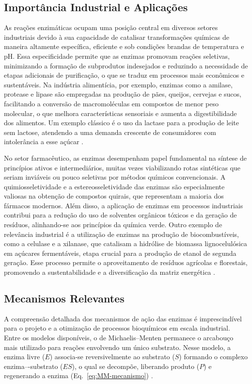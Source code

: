 \documentclass[12pt,oneside]{report}
\begin{document}
\subsection{Importância Industrial e Aplicações}

As reações enzimáticas ocupam uma posição central em diversos setores industriais devido à sua capacidade de catalisar transformações químicas de maneira altamente específica, eficiente e sob condições brandas de temperatura e pH. Essa especificidade permite que as enzimas promovam reações seletivas, minimizando a formação de subprodutos indesejados e reduzindo a necessidade de etapas adicionais de purificação, o que se traduz em processos mais econômicos e sustentáveis. Na indústria alimentícia, por exemplo, enzimas como a amilase, protease e lipase são empregadas na produção de pães, queijos, cervejas e sucos, facilitando a conversão de macromoléculas em compostos de menor peso molecular, o que melhora características sensoriais e aumenta a digestibilidade dos alimentos. Um exemplo clássico é o uso da lactase para a produção de leite sem lactose, atendendo a uma demanda crescente de consumidores com intolerância a esse açúcar \cite{buchholz2016enzymes}.

No setor farmacêutico, as enzimas desempenham papel fundamental na síntese de princípios ativos e intermediários, muitas vezes viabilizando rotas sintéticas que seriam inviáveis ou pouco seletivas por métodos químicos convencionais. A quimiosseletividade e a estereosseletividade das enzimas são especialmente valiosas na obtenção de compostos quirais, que representam a maioria dos fármacos modernos. Além disso, a aplicação de enzimas em processos industriais contribui para a redução do uso de solventes orgânicos tóxicos e da geração de resíduos, alinhando-se aos princípios da química verde. Outro exemplo de relevância industrial é a utilização de enzimas na produção de biocombustíveis, como a celulase e a xilanase, que catalisam a hidrólise de biomassa lignocelulósica em açúcares fermentáveis, etapa crucial para a produção de etanol de segunda geração. Esse processo permite o aproveitamento de resíduos agrícolas e florestais, promovendo a sustentabilidade e a diversificação da matriz energética \cite{patel2007biocatalysis}.

\subsection{Mecanismos Relevantes}

A compreensão detalhada dos mecanismos de ação das enzimas é imprescindível para o projeto e a otimização de processos bioquímicos em escala industrial. Entre os modelos disponíveis, o de Michaelis--Menten permanece o arcabouço mais utilizado para reações envolvendo um único substrato. Nesse modelo, a enzima livre ($E$) associa-se reversivelmente ao substrato ($S$) formando o complexo enzima–-substrato ($ES$), o qual se decompõe, liberando produto ($P$) e regenerando a enzima (Eq.~\ref{eq:MM-mecanismo}) \cite{bisswanger2017}.
\end{document}
